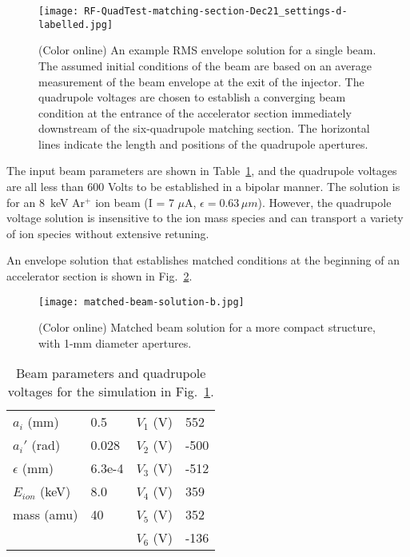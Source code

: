 \documentclass[%
 aip,
rsi,%
 amsmath,amssymb,
 reprint,%
]{revtex4-1}
\begin{document}
\begin{figure}[ht!]
  \centering
  \texttt{[image: RF-QuadTest-matching-section-Dec21\_settings-d-labelled.jpg]}
  \caption{(Color online) An example RMS envelope solution for a single beam.  The assumed initial conditions of the beam are based on an average measurement of the beam envelope at the exit of the injector.  The quadrupole voltages are chosen to establish a converging beam condition at the entrance of the accelerator section immediately downstream of the six-quadrupole matching section. The horizontal lines indicate the length and positions of the quadrupole apertures. }
  \label{fig:match-envelope1}
\end{figure}

The input beam parameters are shown in Table~\ref{tab:simulation}, and the quadrupole voltages are all less than 600 Volts to be established in a bipolar manner.   
The solution is for an 8~keV Ar$^+$ ion beam (I = 7 $\mu$A, $\epsilon = 0.63\, \mu m$).  However, the quadrupole voltage solution is insensitive to the ion mass species and can transport a variety of ion species without extensive retuning.  

An envelope solution that establishes matched conditions at the beginning of an accelerator section is shown in Fig.~\ref{fig:match-envelope2}. 

\begin{figure}[ht!]
  \centering
  \texttt{[image: matched-beam-solution-b.jpg]}
  \caption{(Color online) Matched beam solution for a more compact structure, with 1-mm diameter apertures.}
  \label{fig:match-envelope2}
\end{figure}

\begin{table}
\caption{\label{tab:simulation}Beam parameters and quadrupole voltages for the simulation in Fig.~\ref{fig:match-envelope1}.}
\begin{ruledtabular}
\begin{tabular}{llll}
$a_i$ (mm) &0.5 &$V_1$ (V) & 552\\
$a_i'$ (rad) &0.028 &$V_2$ (V) & -500\\
$\epsilon$ (mm) &6.3e-4 &$V_3$ (V) &-512\\
% 
% 
% 
%
% 
%
$E_{ion}$ (keV) &8.0 &$V_4$ (V) & 359\\
mass (amu) &40 &$V_5$ (V) & 352\\
 & &$V_6$ (V) & -136\\
\end{tabular}
\end{ruledtabular}
\end{table}
\end{document}
